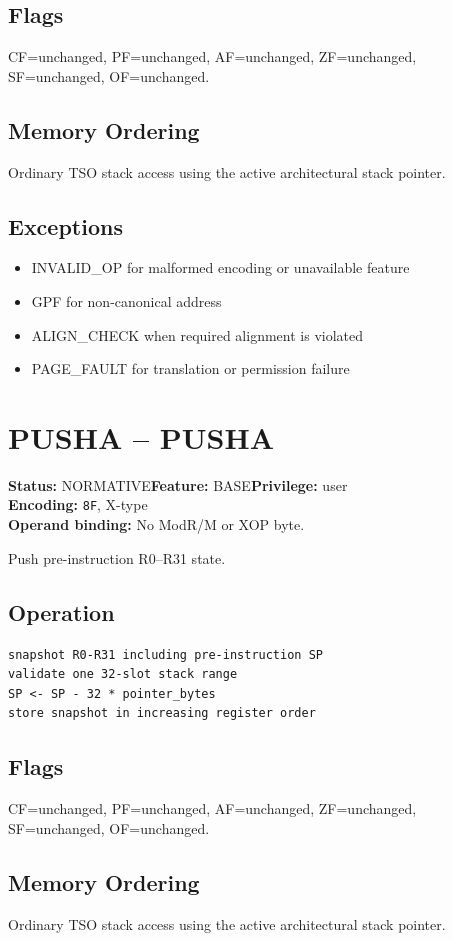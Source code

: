 \documentclass[10pt]{article}
\begin{document}
\subsection*{Flags}
CF=unchanged, PF=unchanged, AF=unchanged, ZF=unchanged, SF=unchanged, OF=unchanged.
\subsection*{Memory Ordering}
Ordinary TSO stack access using the active architectural stack pointer.
\subsection*{Exceptions}
\begin{itemize}
\item INVALID\_OP for malformed encoding or unavailable feature
\item GPF for non-canonical address
\item ALIGN\_CHECK when required alignment is violated
\item PAGE\_FAULT for translation or permission failure
\end{itemize}
\clearpage

\section{PUSHA -- PUSHA}
\textbf{Status:} NORMATIVE\quad \textbf{Feature:} BASE\quad \textbf{Privilege:} user\\
\textbf{Encoding:} \texttt{8F}, X-type\\
\textbf{Operand binding:} No ModR/M or XOP byte.

Push pre-instruction R0--R31 state.

\subsection*{Operation}
\begin{lstlisting}
snapshot R0-R31 including pre-instruction SP
validate one 32-slot stack range
SP <- SP - 32 * pointer_bytes
store snapshot in increasing register order
\end{lstlisting}
\subsection*{Flags}
CF=unchanged, PF=unchanged, AF=unchanged, ZF=unchanged, SF=unchanged, OF=unchanged.
\subsection*{Memory Ordering}
Ordinary TSO stack access using the active architectural stack pointer.
\end{document}
